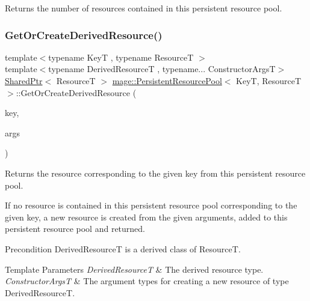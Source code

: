 Returns the number of resources contained in this persistent resource pool. \hypertarget{classmage_1_1_persistent_resource_pool_a1423605c78293295129fde4afa18637a}{}\label{classmage_1_1_persistent_resource_pool_a1423605c78293295129fde4afa18637a} 
\subsubsection{\texorpdfstring{Get\+Or\+Create\+Derived\+Resource()}{GetOrCreateDerivedResource()}}
{\footnotesize\ttfamily template$<$typename KeyT , typename ResourceT $>$ \\
template$<$typename Derived\+ResourceT , typename... Constructor\+ArgsT$>$ \\
\hyperlink{namespacemage_a1e01ae66713838a7a67d30e44c67703e}{Shared\+Ptr}$<$ ResourceT $>$ \hyperlink{classmage_1_1_persistent_resource_pool}{mage\+::\+Persistent\+Resource\+Pool}$<$ KeyT, ResourceT $>$\+::Get\+Or\+Create\+Derived\+Resource (\begin{DoxyParamCaption}\item[{const KeyT \&}]{key,  }\item[{Constructor\+ArgsT \&\&...}]{args }\end{DoxyParamCaption})}

Returns the resource corresponding to the given key from this persistent resource pool.

If no resource is contained in this persistent resource pool corresponding to the given key, a new resource is created from the given arguments, added to this persistent resource pool and returned.

\begin{DoxyPrecond}{Precondition}
{\ttfamily Derived\+ResourceT} is a derived class of {\ttfamily ResourceT}. 
\end{DoxyPrecond}

\begin{DoxyTemplParams}{Template Parameters}
{\em Derived\+ResourceT} & The derived resource type. \\
\hline
{\em Constructor\+ArgsT} & The argument types for creating a new resource of type {\ttfamily Derived\+ResourceT}. \\
\hline
\end{DoxyTemplParams}

